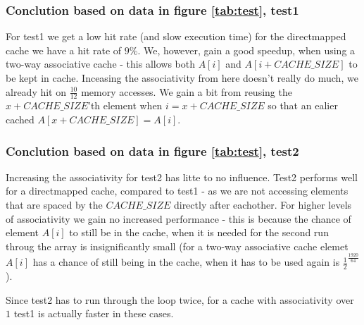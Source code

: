 \subsubsection{Conclution based on data in figure \ref{tab:test}, test1}
For test1 we get a low hit rate (and slow execution time) for the directmapped
cache we have a hit rate of $9\%$. We, however, gain a good speedup, when using
a two-way associative cache - this allows both $A[i]$ and $A[i + CACHE\_SIZE]$
to be kept in cache. Inceasing the associativity from here doesn't really do
much, we already hit on $\frac{10}{12}$ memory accesses. We gain a bit from
reusing the $x + CACHE\_SIZE$'th element when $i = x + CACHE\_SIZE$ so that an
ealier cached $A[x + CACHE\_SIZE] = A[i]$.

\subsubsection{Conclution based on data in figure \ref{tab:test}, test2}
Increasing the associativity for test2 has litte to no influence. Test2 performs
well for a directmapped cache, compared to test1 - as we are not accessing
elements that are spaced by the $CACHE\_SIZE$ directly after eachother. For
higher levels of associativity we gain no increased performance - this is
because the chance of element $A[i]$ to still be in the cache, when it is needed
for the second run throug the array is insignificantly small (for a two-way
associative cache elemet $A[i]$ has a chance of still being in the cache, when
it has to be used again is $\frac{1}{2}^\frac{1920}{64}$).

Since test2 has to run through the loop twice, for a cache with associativity
over $1$ test1 is actually faster in these cases.

%
%
%

